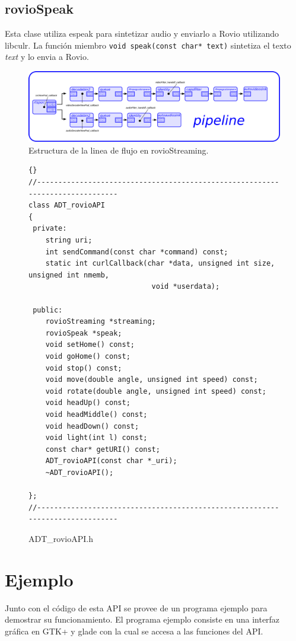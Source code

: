 \documentclass[a4paper,10pt]{article}
\begin{document}
\subsection{rovioSpeak}
	Esta clase utiliza espeak para sintetizar audio y enviarlo a Rovio utilizando libculr. La función miembro \texttt{void speak(const char* text)} sintetiza el texto \textit{text} y lo envia a Rovio.
\begin{figure}
	\includegraphics[width=1\textwidth]{./imagenes/pipe.png}	
	\caption{Estructura de la linea de flujo en rovioStreaming.}
\label{pipeline}
\end{figure}

\begin{figure}

  \lstset{language=c++}
  \lstset{commentstyle=\textit}
  \tiny
  \begin{lstlisting}[frame=trbl]{}
//------------------------------------------------------------------------------
class ADT_rovioAPI
{
 private:
	string uri;
	int sendCommand(const char *command) const;
	static int curlCallback(char *data, unsigned int size, unsigned int nmemb,
							 void *userdata);

 public:
 	rovioStreaming *streaming;
 	rovioSpeak *speak;
	void setHome() const;
	void goHome() const;
	void stop() const;
	void move(double angle, unsigned int speed) const;
	void rotate(double angle, unsigned int speed) const;
	void headUp() const;
	void headMiddle() const;
	void headDown() const;
	void light(int l) const;
	const char* getURI() const;
	ADT_rovioAPI(const char *_uri);
	~ADT_rovioAPI();
	
};
//------------------------------------------------------------------------------

  \end{lstlisting}
  \caption{ADT\_rovioAPI.h}
\end{figure}

\section{Ejemplo}
\label{ejemplo}
  Junto con el código de esta API se provee de un programa ejemplo para demostrar su funcionamiento. El programa ejemplo consiste en una interfaz gráfica en GTK+ y glade con la cual se accesa a las funciones del API.
\end{document}
